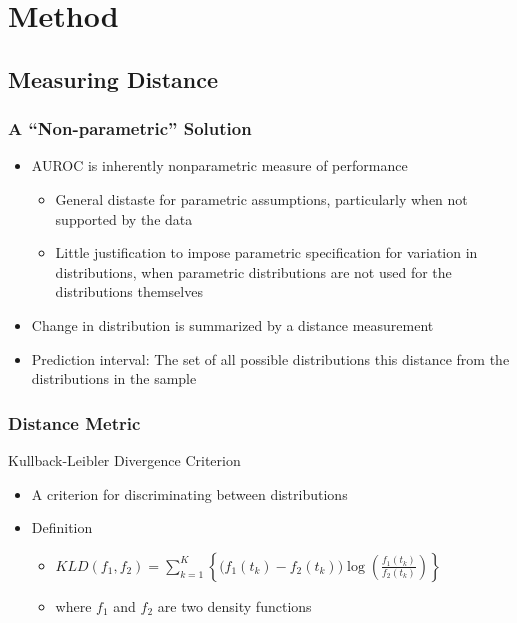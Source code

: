 \documentclass{beamer}
\begin{document}


\section{Method}
\subsection{Measuring Distance}



\begin{frame}
\frametitle{A ``Non-parametric'' Solution}


\begin{itemize}
    \item AUROC is inherently nonparametric measure of performance
    \begin{itemize}
        \item General distaste for parametric assumptions, particularly when not supported by the data
        \item Little justification to impose parametric specification for variation in distributions, when parametric distributions are not used for the distributions themselves
    \end{itemize}
    \item Change in distribution is summarized by a distance measurement
    \item Prediction interval: The set of all possible distributions this distance from the distributions in the sample
\end{itemize}

\end{frame}


\begin{frame}
\frametitle{Distance Metric}

Kullback-Leibler Divergence Criterion
\begin{itemize}
\item A criterion for discriminating between distributions
    \item Definition
    \begin{itemize}
        \item $KLD(f_1, f_2) = \sum_{k = 1}^{K} \left\{ \bigg( f_1(t_k) - f_2(t_k) \bigg) 
        \log \left( \frac{f_1(t_k)}{f_2(t_k)} \right) \right\}$
        \item where $f_1$ and $f_2$ are two density functions
    \end{itemize}
\end{itemize}

\end{frame}
\end{document}
